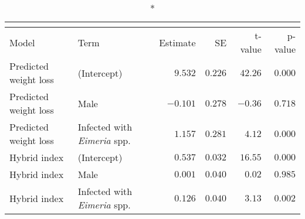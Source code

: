 \begin{longtable}{llrrrr}
\caption*{
{\large }
} \\ 
\toprule
Model & Term & Estimate & SE & t-value & p-value \\ 
\midrule\addlinespace[2.5pt]
Predicted weight loss & (Intercept) & $9.532$ & $0.226$ & $42.26$ & $0.000$ \\ 
Predicted weight loss & Male & $-0.101$ & $0.278$ & $-0.36$ & $0.718$ \\ 
Predicted weight loss & Infected with \emph{Eimeria} spp. & $1.157$ & $0.281$ & $4.12$ & $0.000$ \\ 
Hybrid index & (Intercept) & $0.537$ & $0.032$ & $16.55$ & $0.000$ \\ 
Hybrid index & Male & $0.001$ & $0.040$ & $0.02$ & $0.985$ \\ 
Hybrid index & Infected with \emph{Eimeria} spp. & $0.126$ & $0.040$ & $3.13$ & $0.002$ \\ 
\bottomrule
\end{longtable}

